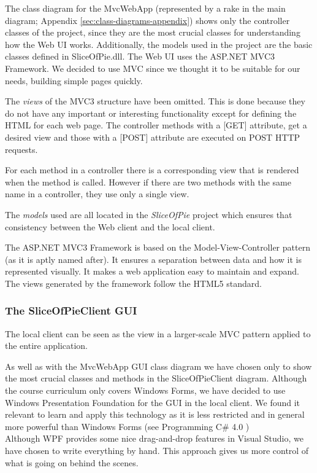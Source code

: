 The class diagram for the MvcWebApp (represented by a rake in the main diagram; Appendix \ref{sec:class-diagrams-appendix}) shows only the controller
classes of the project, since they are the most crucial classes for understanding how the Web UI works. Additionally, the models used in the project
are the basic classes defined in SliceOfPie.dll. The Web UI uses the ASP.NET MVC3 Framework. We decided to use MVC since we thought it to be suitable
for our needs, building simple pages quickly.

The \emph{views} of the MVC3 structure have been omitted. This is done because they do not have any important or interesting functionality except for
defining the HTML for each web page. The controller methods with a [GET] attribute, get a desired view and those with a [POST] attribute are executed on
POST HTTP requests.

For each method in a controller there is a corresponding view that is rendered when the method is called. However if there are two methods with the same 
name in a controller, they use only a single view.

The \emph{models} used are all located in the \emph{SliceOfPie} project which ensures that consistency between the Web client and the local client.

The ASP.NET MVC3 Framework is based on the Model-View-Controller pattern (as it is aptly named after). It ensures a separation between data and how
it is represented visually. It makes a web application easy to maintain and expand. The views generated by the framework follow the HTML5 standard.

\subsubsection{The SliceOfPieClient GUI}

The local client can be seen as the view in a larger-scale MVC pattern applied to the entire application.

As well as with the MvcWebApp GUI class diagram we have chosen only to show the most crucial classes and methods in the SliceOfPieClient diagram.
Although the course curriculum only covers Windows Forms, we have decided to use Windows Presentation Foundation for the GUI in the local client. We found it relevant to learn and apply this technology as it is less restricted and in general more powerful than Windows Forms (see Programming C\# 4.0  \cite[p.795-796]{Griffiths2010}) \\
Although WPF provides some nice drag-and-drop features in Visual Studio, we have chosen to write everything by hand. This approach gives us more control of what is going on behind the scenes.

